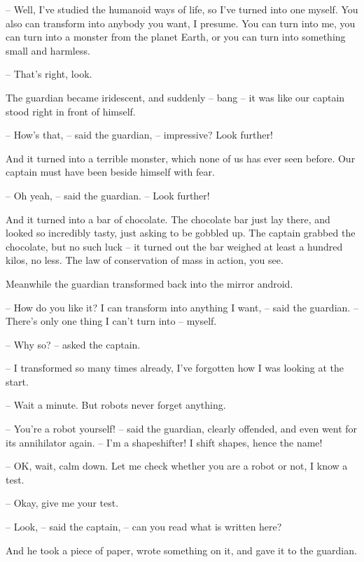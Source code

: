 \documentclass[ebook,oneside,final,openright]{memoir}
\begin{document}
– Well, I’ve studied the humanoid ways of life, so I’ve turned into one myself. You also can transform into anybody you want, I presume. You can turn into me, you can turn into a monster from the planet Earth, or you can turn into something small and harmless.\par
– That’s right, look.\par
\par
The guardian became iridescent, and suddenly – bang – it was like our captain stood right in front of himself.\par
– How’s that, – said the guardian, – impressive? Look further!\par
And it turned into a terrible monster, which none of us has ever seen before. Our captain must have been beside himself with fear.\par
– Oh yeah, – said the guardian. – Look further!\par
\par
And it turned into a bar of chocolate. The chocolate bar just lay there, and looked so incredibly tasty, just asking to be gobbled up. The captain grabbed the chocolate, but no such luck – it turned out the bar weighed at least a hundred kilos, no less. The law of conservation of mass in action, you see.\par
\par
Meanwhile the guardian transformed back into the mirror android.\par
– How do you like it? I can transform into anything I want, – said the guardian. – There’s only one thing I can’t turn into – myself.\par
– Why so? – asked the captain.\par
– I transformed so many times already, I’ve forgotten how I was looking at the start.\par
– Wait a minute. But robots never forget anything.\par
– You’re a robot yourself! – said the guardian, clearly offended, and even went for its annihilator again. – I’m a shapeshifter! I shift shapes, hence the name!\par
– OK, wait, calm down. Let me check whether you are a robot or not, I know a test.\par
– Okay, give me your test.\par
– Look, – said the captain, – can you read what is written here?\par
And he took a piece of paper, wrote something on it, and gave it to the guardian.\par
\end{document}
